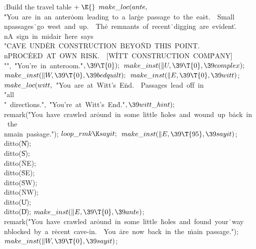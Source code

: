 \Y\B\4:Build the travel table\X${}\mathrel+\E{}$\6
$\\{make\_loc}(\\{ante},{}$\6
\.{"You\ are\ in\ an\ anter}\)\.{oom\ leading\ to\ a\ lar}\)\.{ge\ passage\ to\ the\ ea}\)\.{st.\ \ Small\\npassages}\)\.{\ go\ west\ and\ up.\ \ Th}\)\.{e\ remnants\ of\ recent}\)\.{\ digging\ are\ evident}\)\.{.\\nA\ sign\ in\ midair\ }\)\.{here\ says\
\\"CAVE\ UND}\)\.{ER\ CONSTRUCTION\ BEYO}\)\.{ND\ THIS\ POINT.\\nPROC}\)\.{EED\ AT\ OWN\ RISK.\ \ [W}\)\.{ITT\ CONSTRUCTION\ COM}\)\.{PANY]\\""}${},{}$\6
\.{"You're\ in\ anteroom.}\)\.{"}${},\39\T{0});{}$\6
${}\\{make\_inst}(\|U,\39\T{0},\39\\{complex});{}$\6
${}\\{make\_inst}(\|W,\39\T{0},\39\\{bedquilt});{}$\6
${}\\{make\_inst}(\|E,\39\T{0},\39\\{witt}){}$;\7
${}\\{make\_loc}(\\{witt},{}$\6
\.{"You\ are\ at\ Witt's\ E}\)\.{nd.\ \ Passages\ lead\ o}\)\.{ff\ in\ \\"all\\"\ direct}\)\.{ions."}${},{}$\6
\.{"You're\ at\ Witt's\ En}\)\.{d."}${},\39\\{witt\_hint});{}$\6
\\{remark}(\.{"You\ have\ crawled\ ar}\)\.{ound\ in\ some\ little\ }\)\.{holes\ and\ wound\ up\ b}\)\.{ack\ in\ the\\nmain\ pas}\)\.{sage."});\6
${}\\{loop\_rmk}\K\\{sayit};{}$\6
${}\\{make\_inst}(\|E,\39\T{95},\39\\{sayit}){}$;\5
\\{ditto}(\|N);\5
\\{ditto}(\|S);\6
\\{ditto}(\.{NE});\5
\\{ditto}(\.{SE});\5
\\{ditto}(\.{SW});\5
\\{ditto}(\.{NW});\5
\\{ditto}(\|U);\5
\\{ditto}(\|D);\6
${}\\{make\_inst}(\|E,\39\T{0},\39\\{ante}){}$;\6
\\{remark}(\.{"You\ have\ crawled\ ar}\)\.{ound\ in\ some\ little\ }\)\.{holes\ and\ found\ your}\)\.{\ way\\nblocked\ by\ a\ r}\)\.{ecent\ cave-in.\ \ You\ }\)\.{are\ now\ back\ in\ the\ }\)\.{main\ passage."});\6
${}\\{make\_inst}(\|W,\39\T{0},\39\\{sayit}){}$;\par
\fi

